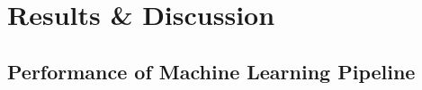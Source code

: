 \documentclass[
  english,        %
  font=times,     %
  onecolumn,      %
]{article}
\begin{document}
\section{Results \& Discussion}
\subsection*{Performance of Machine Learning Pipeline} \label{sec:comparison}
\end{document}

